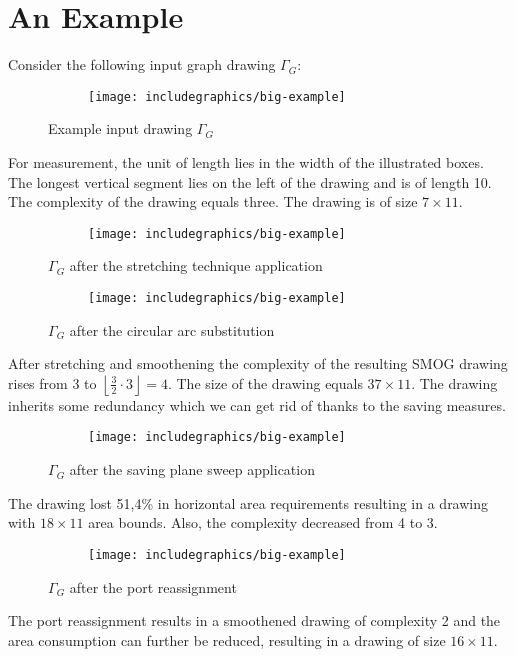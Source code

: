 \section{An Example}
Consider the following input graph drawing $\Gamma_G$:
\begin{figure}[H]
	\centering
	\begin{subfigure}{\textwidth}
		\centering
		\texttt{[image: includegraphics/big-example]}
	\end{subfigure}
	\caption{Example input drawing $\Gamma_G$}
\end{figure}
For measurement, the unit of length lies in the width of the illustrated boxes. The longest vertical segment lies on the left of the drawing and is of length 10. The complexity of the drawing equals three. The drawing is of size $7\times11$. 
\begin{figure}[H]
	\centering
	\begin{subfigure}{\textwidth}
		\centering
		\texttt{[image: includegraphics/big-example]}
	\end{subfigure}
	\caption{$\Gamma_G$ after the stretching technique application}
\end{figure}
\begin{figure}[H]
	\centering
	\begin{subfigure}{\textwidth}
		\centering
		\texttt{[image: includegraphics/big-example]}
	\end{subfigure}
	\caption{$\Gamma_G$ after the circular arc substitution}
\end{figure}
After stretching and smoothening the complexity of the resulting SMOG drawing rises from 3 to $\left\lfloor\frac{3}{2}\cdot 3\right\rfloor = 4$. The size of the drawing equals $37\times11$. The drawing inherits some redundancy which we can get rid of thanks to the saving measures.
\begin{figure}[H]
	\centering
	\begin{subfigure}{\textwidth}
		\centering
		\texttt{[image: includegraphics/big-example]}
	\end{subfigure}
	\caption{$\Gamma_G$ after the saving plane sweep application}
\end{figure}
The drawing lost 51,4\% in horizontal area requirements resulting in a drawing with $18\times11$ area bounds. Also, the complexity decreased from 4 to 3.
\begin{figure}[H]
	\centering
	\begin{subfigure}{\textwidth}
		\centering
		\texttt{[image: includegraphics/big-example]}
	\end{subfigure}
	\caption{$\Gamma_G$ after the port reassignment}
\end{figure}
The port reassignment results in a smoothened drawing of complexity 2 and the area consumption can further be reduced, resulting in a drawing of size $16\times 11$.